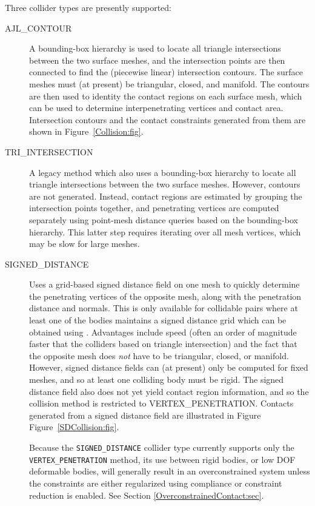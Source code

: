 Three collider types are presently supported:

\begin{description}

\item[AJL\_CONTOUR]\mbox{}

A bounding-box hierarchy is used to locate all triangle intersections
between the two surface meshes, and the intersection points are then
connected to find the (piecewise linear) intersection contours.  The
surface meshes must (at present) be triangular, closed, and manifold.
The contours are then used to identity the contact regions
on each surface mesh, which can be used to determine interpenetrating
vertices and contact area. Intersection contours and the contact
constraints generated from them are shown in Figure~\ref{Collision:fig}.

\item[TRI\_INTERSECTION]\mbox{}

A legacy method which also uses a bounding-box hierarchy to locate all
triangle intersections between the two surface meshes. However,
contours are not generated. Instead, contact regions are estimated by
grouping the intersection points together, and penetrating vertices
are computed separately using point-mesh distance queries based on the
bounding-box hierarchy. This latter step requires iterating over all
mesh vertices, which may be slow for large meshes.

\item[SIGNED\_DISTANCE]\mbox{}

Uses a grid-based signed distance field on one mesh to quickly
determine the penetrating vertices of the opposite mesh, along with
the penetration distance and normals.  This is only available for
collidable pairs where at least one of the bodies maintains a signed
distance grid which can be obtained using
.
Advantages include speed (often
an order of magnitude faster that the colliders based on triangle
intersection) and the fact that the opposite mesh does {\it not} have
to be triangular, closed, or manifold.  However, signed distance
fields can (at present) only be computed for fixed meshes, and so at
least one colliding body must be rigid.  The signed distance field
also does not yet yield contact region information, and so the collision
method is restricted to
%
{VERTEX\_PENETRATION}.
Contacts generated from a signed distance field are illustrated in
Figure Figure~\ref{SDCollision:fig}.

\begin{sideblock}
Because the {\tt SIGNED\_DISTANCE} collider type currently supports
only the {\tt VERTEX\_PENETRATION} method, its use between rigid
bodies, or low DOF deformable bodies, will generally result in an
overconstrained system unless the constraints are either regularized
using compliance or constraint reduction is enabled. See Section
\ref{OverconstrainedContact:sec}.
\end{sideblock}

\end{description}

